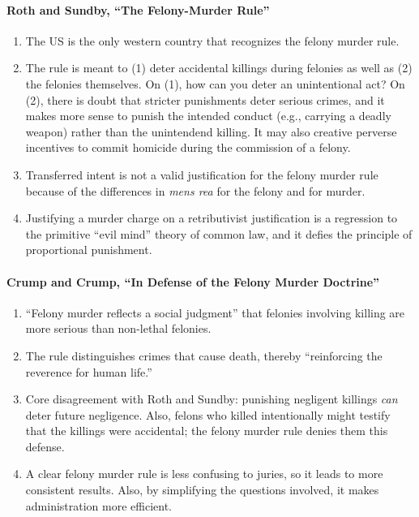 \paragraph{Roth and Sundby, ``The Felony-Murder Rule''}

\begin{enumerate}
    \item The US is the only western country that recognizes the felony murder rule.
    \item The rule is meant to (1) deter accidental killings during felonies as well as (2) the felonies themselves. On (1), how can you deter an unintentional act? On (2), there is doubt that stricter punishments deter serious crimes, and it makes more sense to punish the intended conduct (e.g., carrying a deadly weapon) rather than the unintendend killing. It may also creative perverse incentives to commit homicide during the commission of a felony.
    \item Transferred intent is not a valid justification for the felony murder rule because of the differences in \emph{mens rea} for the felony and for murder.
    \item Justifying a murder charge on a retributivist justification is a regression to the primitive ``evil mind'' theory of common law, and it defies the principle of proportional punishment.
\end{enumerate}

\paragraph{Crump and Crump, ``In Defense of the Felony Murder Doctrine''}

\begin{enumerate}
    \item ``Felony murder reflects a social judgment'' that felonies involving killing are more serious than non-lethal felonies.
    \item The rule distinguishes crimes that cause death, thereby ``reinforcing the reverence for human life.''
    \item Core disagreement with Roth and Sundby: punishing negligent killings \emph{can} deter future negligence. Also, felons who killed intentionally might testify that the killings were accidental; the felony murder rule denies them this defense.
    \item A clear felony murder rule is less confusing to juries, so it leads to more consistent results. Also, by simplifying the questions involved, it makes administration more efficient.
\end{enumerate}

